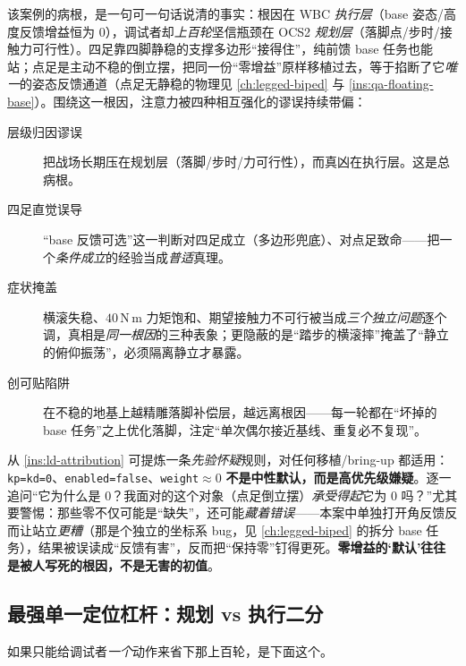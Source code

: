 \begin{insight}\label{ins:ld-attribution}
该案例的病根，是一句可一句话说清的事实：根因在 WBC \emph{执行层}（base 姿态/高度反馈增益恒为 $0$），调试者却\emph{上百轮}坚信瓶颈在 OCS2 \emph{规划层}（落脚点/步时/接触力可行性）。四足靠四脚静稳的支撑多边形“接得住”，纯前馈 base 任务也能站；点足是主动不稳的倒立摆，把同一份“零增益”原样移植过去，等于掐断了它\emph{唯一}的姿态反馈通道（点足无静稳的物理见 \cref{ch:legged-biped} 与 \cref{ins:qa-floating-base}）。围绕这一根因，注意力被四种相互强化的谬误持续带偏：
\begin{description}
  \item[层级归因谬误] 把战场长期压在规划层（落脚/步时/力可行性），而真凶在执行层。这是总病根。
  \item[四足直觉误导] “base 反馈可选”这一判断对四足成立（多边形兜底）、对点足致命——把一个\emph{条件成立}的经验当成\emph{普适}真理。
  \item[症状掩盖] 横滚失稳、$40\,\mathrm{N\,m}$ 力矩饱和、期望接触力不可行被当成\emph{三个独立问题}逐个调，真相是\emph{同一根因}的三种表象；更隐蔽的是“踏步的横滚摔”掩盖了“静立的俯仰振荡”，必须隔离静立才暴露。
  \item[创可贴陷阱] 在不稳的地基上越精雕落脚补偿层，越远离根因——每一轮都在“坏掉的 base 任务”之上优化落脚，注定“单次偶尔接近基线、重复必不复现”。
\end{description}
\end{insight}

\begin{insight}[质疑一切被默认置零的反馈与约束]\label{ins:ld-zero-suspect}
从 \cref{ins:ld-attribution} 可提炼一条\emph{先验怀疑}规则，对任何移植/bring-up 都适用：\texttt{kp=kd=0}、\texttt{enabled=false}、\texttt{weight}$\approx 0$ \textbf{不是中性默认，而是高优先级嫌疑}。逐一追问“它为什么是 $0$？我面对的这个对象（点足倒立摆）\emph{承受得起}它为 $0$ 吗？”尤其要警惕：那些零不仅可能是“缺失”，还可能\emph{藏着错误}——本案中单独打开角反馈反而让站立\emph{更糟}（那是个独立的坐标系 bug，见 \cref{ch:legged-biped} 的拆分 base 任务），结果被误读成“反馈有害”，反而把“保持零”钉得更死。\textbf{零增益的‘默认’往往是被人写死的根因，不是无害的初值}。
\end{insight}

\subsection{最强单一定位杠杆：规划 vs 执行二分}
\label{subsec:ld-lever}

如果只能给调试者\emph{一个}动作来省下那上百轮，是下面这个。


